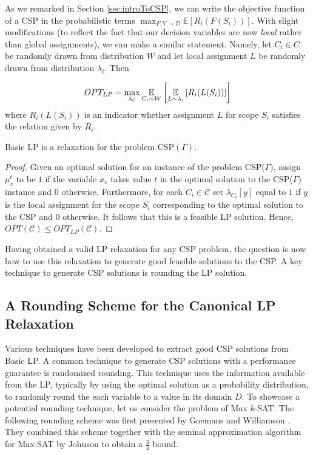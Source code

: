 As we remarked in Section \ref{sec:introToCSP}, we can write the objective function of a CSP in the probabilistic terms $\max_{F : V \to D} \mathbb{E}\left[ R_i(F(S_i)) \right]$. With slight modifications (to reflect the fact that our decision variables are now \textit{local} rather than global assignments), we can make a similar statement. Namely, let $C_i \in C$ be randomly drawn from distribution $W$ and let local assignment $L$ be randomly drawn from distribution $\lambda_i$. Then 

\[
	OPT_{LP} = \max_{\lambda_{\mathcal{C}}} \underset{C_i \sim W}{\mathbb{E}} \left[ \underset{L \sim \lambda_{i}}{\mathbb{E}} \left[ R_i( L (S_i )) \right] \right]
\]
where $R_i( L (S_i ))$ is an indicator whether assignment $L$ for scope $S_i$ satisfies the relation given by $R_i$.

\begin{thm}
	Basic LP is a relaxation for the problem CSP$(\Gamma)$.
\end{thm}
\begin{proof}
	Given an optimal solution for an instance of the problem CSP($\Gamma$), assign $\mu_v^t$ to be $1$ if the variable $x_v$ takes value $t$ in the optimal solution to the CSP($\Gamma$) instance and $0$ otherwise.
	Furthermore, for each $C_i \in \mathcal{C}$ set $\lambda_{C_i}[y]$ equal to $1$ if $y$ is the local assignment for the scope $S_i$ corresponding to the optimal solution to the CSP and $0$ otherwise. 
	It follows that this is a feasible LP solution. 
	Hence, $OPT(\mathcal{C}) \le OPT_{LP}(\mathcal{C})$.
\end{proof}

Having obtained a valid LP relaxation for any CSP problem, the question is now how to use this relaxation to generate good feasible solutions to the CSP. 
A key technique to generate CSP solutions is rounding the LP solution.

\subsection{A Rounding Scheme for the Canonical LP Relaxation}
Various techniques have been developed to extract good CSP solutions from Basic LP.
A common technique to generate CSP solutions with a performance guarantee is randomized rounding.
This technique uses the information available from the LP, typically by using the optimal solution as a probability distribution, to randomly round the each variable to a value in its domain $D$.
To showcase a potential rounding technique, let us consider the problem of Max $k$-SAT. The following rounding scheme was first presented by Goemans and Williamson \cite{GoeWil94}. They combined this scheme together with the seminal approximation algorithm for Max-SAT by Johnson \cite{Joh73} to obtain a $\frac{3}{4}$ bound.

